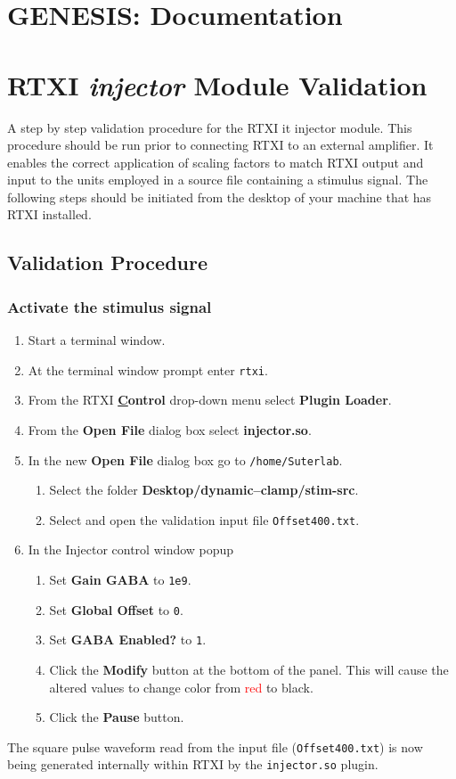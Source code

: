 \documentclass[12pt]{article}
\begin{document}
\section*{GENESIS: Documentation}

\section*{RTXI {\it injector} Module Validation}
A step by step validation procedure for the RTXI {it injector} module. This procedure should be run prior to connecting RTXI to an external amplifier. It enables the correct application of scaling factors to match RTXI output and input to the units employed in a source file containing a stimulus signal. The following steps should be initiated from the desktop of your machine that has RTXI installed. 

\subsection*{Validation Procedure}

\subsubsection*{Activate the stimulus signal}

\begin{enumerate}
	\item Start a terminal window.
	\item At the terminal window prompt enter {\tt rtxi}.
	\item From the RTXI {\bf \underline Control} drop-down menu select {\bf Plugin Loader}.
	\item From the {\bf Open File} dialog box select {\bf injector.so}.
	\item In the new {\bf Open File} dialog box go to {\tt /home/Suterlab}.

	\begin{enumerate}
		\item Select the folder {\bf Desktop/dynamic--clamp/stim-src}.
		\item Select and open the validation input file {\tt Offset400.txt}.
	\end{enumerate}

	\item In the Injector control window popup
	\begin{enumerate}
		\item Set {\bf Gain GABA} to {\tt 1e9}.
		\item Set {\bf Global Offset} to {\tt 0}.
		\item Set {\bf GABA Enabled?} to {\tt 1}.
		\item Click the {\bf Modify} button at the bottom of the panel. This will cause the altered values 
			to change color from \textcolor{red}{red} to black.
		\item Click the {\bf Pause} button.
	\end{enumerate}
\end{enumerate}
The square pulse waveform read from the input file ({\tt Offset400.txt}) is now being generated internally within RTXI by the {\tt injector.so} plugin.
\end{document}
